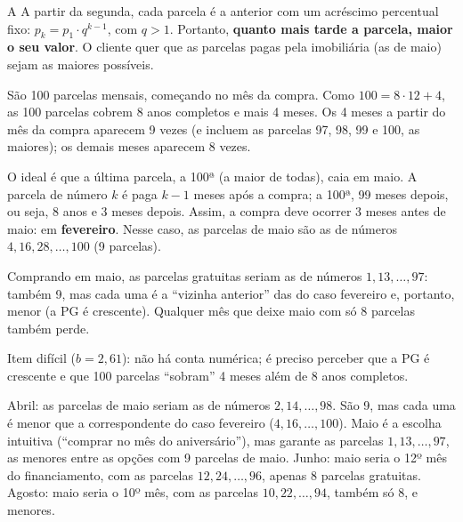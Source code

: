 \begin{resolucao}{A}
 A partir da segunda, cada
parcela é a anterior com um acréscimo percentual fixo: $p_k = p_1 \cdot q^{k-1}$,
com $q > 1$. Portanto, \textbf{quanto mais tarde a parcela, maior o seu valor}.
O cliente quer que as parcelas pagas pela imobiliária (as de maio) sejam as
maiores possíveis.

 São 100 parcelas mensais,
começando no mês da compra. Como $100 = 8 \cdot 12 + 4$, as 100 parcelas
cobrem 8 anos completos e mais 4 meses. Os 4 meses a partir do mês da compra
aparecem 9 vezes (e incluem as parcelas 97, 98, 99 e 100, as maiores); os
demais meses aparecem 8 vezes.

 O ideal é que a última parcela, a 100ª (a
maior de todas), caia em maio. A parcela de número $k$ é paga $k - 1$ meses
após a compra; a 100ª, 99 meses depois, ou seja, 8 anos e 3 meses depois.
Assim, a compra deve ocorrer 3 meses antes de maio: em \textbf{fevereiro}.
Nesse caso, as parcelas de maio são as de números $4, 16, 28, \dots, 100$
(9 parcelas).

 Comprando em maio, as parcelas
gratuitas seriam as de números $1, 13, \dots, 97$: também 9, mas cada uma é a
“vizinha anterior” das do caso fevereiro e, portanto, menor (a PG é crescente).
Qualquer mês que deixe maio com só 8 parcelas também perde.


Item difícil ($b = 2{,}61$): não há conta numérica; é preciso perceber que a
PG é crescente e que 100 parcelas “sobram” 4 meses além de 8 anos completos.

\begin{distratores}
 Abril: as parcelas de maio seriam as de números $2, 14, \dots, 98$.
São 9, mas cada uma é menor que a correspondente do caso fevereiro
($4, 16, \dots, 100$).
 Maio é a escolha intuitiva (“comprar no mês do aniversário”), mas
garante as parcelas $1, 13, \dots, 97$, as menores entre as opções com 9
parcelas de maio.
 Junho: maio seria o 12º mês do financiamento, com as parcelas
$12, 24, \dots, 96$, apenas 8 parcelas gratuitas.
 Agosto: maio seria o 10º mês, com as parcelas $10, 22, \dots, 94$,
também só 8, e menores.
\end{distratores}
\end{resolucao}

